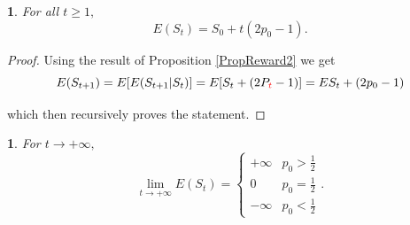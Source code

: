 \documentclass{amsart}
\theoremstyle{definition}
\theoremstyle{plain}
\newtheorem{prop}[thm]{\protect\propositionname}
\theoremstyle{plain}
\newtheorem{cor}[thm]{\protect\corollaryname}
\theoremstyle{plain}
\numberwithin{equation}{section}
\providecommand{\corollaryname}{Corollary}
\providecommand{\propositionname}{Proposition}
\begin{document}
    \begin{prop}
        For all $t\geq1,$
        \[
            E(S_{t})=S_{0}+t(2p_{0}-1).
        \]
    \end{prop}
    \begin{proof}
        Using the result of Proposition \ref{PropReward2} we get
        \[
            E(S_{t+1})=E[E(S_{t+1}|S_{t})]=E[S_{t}+(2P_{ \color{red}t}-1)]=
            ES_{t}+(2p_{0}-1)
        \]

        which then recursively proves the statement.
    \end{proof}

    \begin{cor}
        For $t\rightarrow+\infty,$ \textup{
            \[
                \lim_{t\to+\infty}E(S_{t})=\begin{cases}
                                               +\infty & p_{0}>\frac{1}{2}\\
                                               0 & p_{0}=\frac{1}{2}\\
                                               -\infty & p_{0}<\frac{1}{2}
                \end{cases}.
            \]
        }
    \end{cor}
\end{document}
